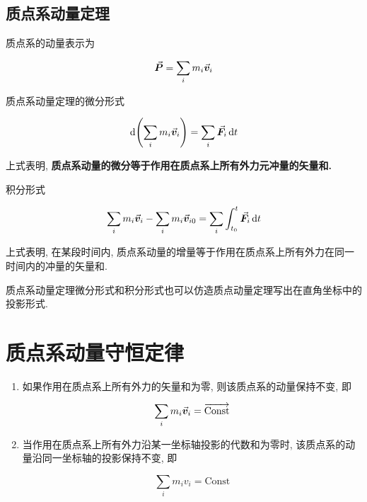 \subsection{质点系动量定理}

质点系的动量表示为

\begin{equation}
	\va*{P} = \sum\limits_{i} m_i \va*{v}_i \label{C4-eq4}
\end{equation}

\begin{theorem}[质点系动量定理] \label{C4-th2}
	质点系动量定理的微分形式
	
	\begin{equation}
		\dd{\qty(\sum\limits_{i} m_i \va*{v}_i)} = \sum\limits_{i} \va*{F}_i \dd{t} \label{C4-eq5}
	\end{equation}
	
	上式表明, \textbf{质点系动量的微分等于作用在质点系上所有外力元冲量的矢量和. }
	
	\newpage
	
	积分形式
	
	\begin{equation}
		\sum\limits_{i} m_i \va*{v}_i - \sum\limits_{i} m_i \va*{v}_{i0} = \sum\limits_{i} \int_{t_0}^{t} \va*{F}_i \dd{t} \label{C4-eq6}
	\end{equation}
	
	上式表明, 在某段时间内, 质点系动量的增量等于作用在质点系上所有外力在同一时间内的冲量的矢量和.
\end{theorem}

质点系动量定理微分形式和积分形式也可以仿造质点动量定理写出在直角坐标中的投影形式. 

\section{质点系动量守恒定律} \label{4.2}

\begin{axiom}[质点系动量守恒定律] \label{C4-ax1}
	\begin{enumerate}
		
		\item 如果作用在质点系上所有外力的矢量和为零, 则该质点系的动量保持不变, 即
		
		\begin{equation}
			\sum\limits_{i} m_i \va*{v}_i = \overrightarrow{\text{Const}} \label{C4-eq7}
		\end{equation}
		
		\item 当作用在质点系上所有外力沿某一坐标轴投影的代数和为零时, 该质点系的动量沿同一坐标轴的投影保持不变, 即
		
		\begin{equation}
			\sum\limits_{i} m_i v_i = \text{Const} \label{C4-eq8}
		\end{equation}
		
	\end{enumerate}
\end{axiom}

